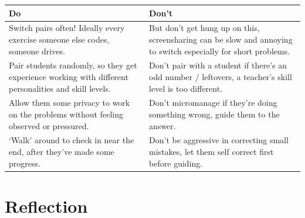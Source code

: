 \documentclass[paper=a4,justified,a4paper]{tufte-handout}
\begin{document}
\begin{longtable}[]{@{}ll@{}}
\toprule
\begin{minipage}[b]{0.47\columnwidth}\raggedright
Do\strut
\end{minipage} & \begin{minipage}[b]{0.47\columnwidth}\raggedright
Don't\strut
\end{minipage}\tabularnewline
\midrule
\endhead
\begin{minipage}[t]{0.47\columnwidth}\raggedright
Switch pairs often! Ideally every exercise someone else codes, someone
drives.\strut
\end{minipage} & \begin{minipage}[t]{0.47\columnwidth}\raggedright
But don't get hung up on this, screensharing can be slow and annoying to
switch especially for short problems.\strut
\end{minipage}\tabularnewline
\begin{minipage}[t]{0.47\columnwidth}\raggedright
Pair students randomly, so they get experience working with different
personalities and skill levels.\strut
\end{minipage} & \begin{minipage}[t]{0.47\columnwidth}\raggedright
Don't pair with a student if there's an odd number / leftovers, a
teacher's skill level is too different.\strut
\end{minipage}\tabularnewline
\begin{minipage}[t]{0.47\columnwidth}\raggedright
Allow them some privacy to work on the problems without feeling observed
or pressured.\strut
\end{minipage} & \begin{minipage}[t]{0.47\columnwidth}\raggedright
Don't micromanage if they're doing something wrong, guide them to the
answer.\strut
\end{minipage}\tabularnewline
\begin{minipage}[t]{0.47\columnwidth}\raggedright
`Walk' around to check in near the end, after they've made some
progress.\strut
\end{minipage} & \begin{minipage}[t]{0.47\columnwidth}\raggedright
Don't be aggressive in correcting small mistakes, let them self correct
first before guiding.\strut
\end{minipage}\tabularnewline
\bottomrule
\end{longtable}

\hypertarget{reflection}{%
\section{Reflection}\label{reflection}}
\end{document}
